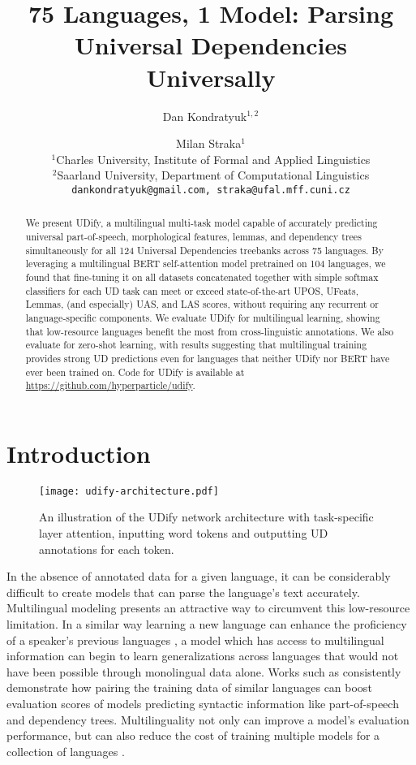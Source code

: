 \documentclass[11pt,a4paper]{article}
\title{75 Languages, 1 Model: Parsing Universal Dependencies Universally}
\author{
    Dan Kondratyuk$^{1,2}$ \and
    Milan Straka$^{1}$ \\
    $^{1}$Charles University, Institute of Formal and Applied Linguistics\\
    $^{2}$Saarland University, Department of Computational Linguistics \\
    {\tt\footnotesize dankondratyuk@gmail.com, straka@ufal.mff.cuni.cz}
}
\date{}
\begin{document}
\maketitle
\begin{abstract}
    We present UDify, a multilingual multi-task model capable of accurately predicting universal part-of-speech, morphological features, lemmas, and dependency trees simultaneously for all 124 Universal Dependencies treebanks across 75 languages.
    By leveraging a multilingual BERT self-attention model pretrained on 104 languages, we found that fine-tuning it on all datasets concatenated together with simple softmax classifiers for each UD task can meet or exceed state-of-the-art UPOS, UFeats, Lemmas, (and especially) UAS, and LAS scores, without requiring any recurrent or language-specific components.
    We evaluate UDify for multilingual learning, showing that low-resource languages benefit the most from cross-linguistic annotations.
    We also evaluate for zero-shot learning, with results suggesting that multilingual training provides strong UD predictions even for languages that neither UDify nor BERT have ever been trained on.
Code for UDify is available at \url{https://github.com/hyperparticle/udify}.
\end{abstract}

\section{Introduction}

\begin{figure}[!ht]
    \centering
    \texttt{[image: udify-architecture.pdf]}
    \caption{\label{fig:udify-architecture}
        An illustration of the UDify network architecture with task-specific layer attention, inputting word tokens and outputting UD annotations for each token.
    }
\end{figure}

In the absence of annotated data for a given language, it can be considerably difficult to create models that can parse the language's text accurately.
Multilingual modeling presents an attractive way to circumvent this low-resource limitation.
In a similar way learning a new language can enhance the proficiency of a speaker's previous languages \cite{abu2010advantages}, a model which has access to multilingual information can begin to learn generalizations across languages that would not have been possible through monolingual data alone.
Works such as  consistently demonstrate how pairing the training data of similar languages can boost evaluation scores of models predicting syntactic information like part-of-speech and dependency trees.
Multilinguality not only can improve a model's evaluation performance, but can also reduce the cost of training multiple models for a collection of languages \cite{johnson2017google, smith201882}.
\end{document}
